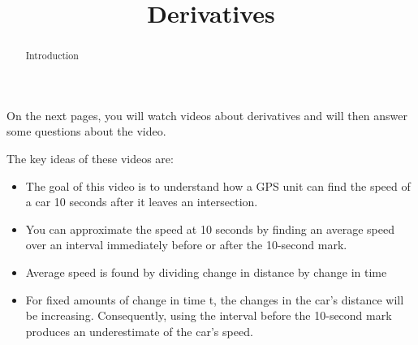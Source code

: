 \documentclass[handout]{ximera}
\title{Derivatives}
\begin{document}
\begin{abstract} Introduction %
\end{abstract}


\maketitle

On the next pages, you will watch videos about derivatives and will then answer some questions about the video.

The key ideas of these videos are:
\begin{itemize}
\item The goal of this video is to understand how a GPS unit can find the speed of a car 10 seconds after it leaves an intersection.
\item You can approximate the speed at 10 seconds by finding an average speed over an interval immediately before or after the 10-second mark.
\item Average speed is found by dividing change in distance by change in time
\item For fixed amounts of change in time	t, the changes in the car’s distance will be increasing. Consequently, using the interval before the 10-second mark produces an underestimate of the car’s speed.
\end{itemize}
\end{document}
